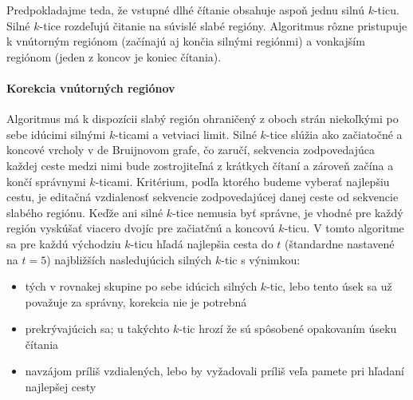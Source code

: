 Predpokladajme teda, že vstupné dlhé čítanie obsahuje aspoň jednu silnú $k$-ticu. Silné $k$-tice rozdeľujú čitanie na súvislé slabé regióny. Algoritmus rôzne pristupuje k vnútorným regiónom (začínajú aj končia silnými regiónmi) a vonkajším regiónom (jeden z koncov je koniec čítania).

\paragraph{Korekcia vnútorných regiónov}

Algoritmus má k dispozícii slabý región ohraničený z oboch strán niekoľkými po sebe idúcimi silnými $k$-ticami a vetviaci limit. Silné $k$-tice slúžia ako začiatočné a koncové vrcholy v de Bruijnovom grafe, čo zaručí, sekvencia zodpovedajúca každej ceste medzi nimi bude zostrojiteľná z krátkych čítaní a zároveň začína a končí správnymi $k$-ticami. Kritérium, podľa ktorého budeme vyberať najlepšiu cestu, je editačná vzdialenosť sekvencie zodpovedajúcej danej ceste od sekvencie slabého regiónu.
Keďže ani silné $k$-tice nemusia byť správne, je vhodné pre každý región vyskúšať viacero dvojíc pre začiatčnú a koncovú $k$-ticu. V tomto algoritme sa pre každú východziu $k$-ticu hľadá najlepšia cesta do $t$ (štandardne nastavené na $t = 5$) najbližších nasledujúcich silných $k$-tic s výnimkou:
\begin{itemize}
\item tých v rovnakej skupine po sebe idúcich silných $k$-tic, lebo tento úsek sa už považuje za správny, korekcia nie je potrebná
\item prekrývajúcich sa; u takýchto $k$-tic hrozí že sú spôsobené opakovaním úseku čítania
\item navzájom príliš vzdialených, lebo by vyžadovali príliš veľa pamete pri hľadaní najlepšej cesty
\end{itemize}

